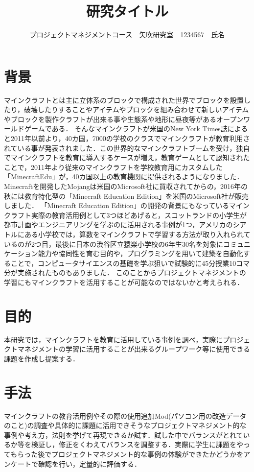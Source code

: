 \documentclass[uplatex,twocolumn,dvipdfmx]{jsarticle}
\title{\vspace{-5mm}\fontsize{14pt}{0pt}\selectfont 研究タイトル}
\author{\normalsize プロジェクトマネジメントコース　矢吹研究室　1234567　氏名}
\date{}
\begin{document}
\fontsize{10.5pt}{\baselineskip}\selectfont
\maketitle





\section{背景}

マインクラフトとは主に立体系のブロックで構成された世界でブロックを設置したり，破壊したりすることやアイテムやブロックを組み合わせて新しいアイテムやブロックを製作クラフトが出来る事や生態系や地形に昼夜等があるオープンワールドゲームである．
そんなマインクラフトが米国のNew York Times誌によると2011年以前より，40カ国，7000の学校のクラスでマインクラフトが教育利用されている事が発表されました．この世界的なマインクラフトブームを受け，独自でマインクラフトを教育に導入するケースが増え，教育ゲームとして認知されたことで，2011年より従来のマインクラフトを学校教育用にカスタムした「MinecraftEdu」が，40カ国以上の教育機関に提供されるようになりました．\cite{self}
Minecraftを開発したMojangは米国のMicrosoft社に買収されてからの，2016年の秋には教育特化型の「Minecraft Education Edition」を米国のMicrosoft社が販売しました．
「Minecraft Education Edition」の開発の背景にもなっているマインクラフト実際の教育活用例として3つほどあげると，スコットランドの小学生が都市計画やエンジニアリングを学ぶのに活用される事例が1つ\cite{self2}，アメリカのシアトルにある小学校では，算数をマインクラフトで学習する方法が取り入れられているのが2つ目，最後に日本の渋谷区立猿楽小学校の6年生30名を対象にコミュニケーション能力や協同性を育む目的や，プログラミングを用いて建築を自動化することで，コンピュータサイエンスの基礎を学ぶ狙いで試験的に45分授業10コマ分が実施されたものもありました．
このことからプロジェクトマネジメントの学習にもマインクラフトを活用することが可能なのではないかと考えられる．




\section{目的}
本研究では，マインクラフトを教育に活用している事例を調べ，実際にプロジェクトマネジメントの学習に活用することが出来るグループワーク等に使用できる課題を作成し提案する．

\section{手法}
マインクラフトの教育活用例やその際の使用追加Mod(パソコン用の改造データのこと)の調査や具体的に課題に活用できそうなプロジェクトマネジメント的な事例や考え方，法則を挙げて再現できるか試す．試した中でバランスがとれているか等を検証し，修正をくわえてバランスを調整する．実際に学生に課題をやってもらった後でプロジェクトマネジメント的な事例の体験ができたかどうかをアンケートで確認を行い，定量的に評価する．
\end{document}
